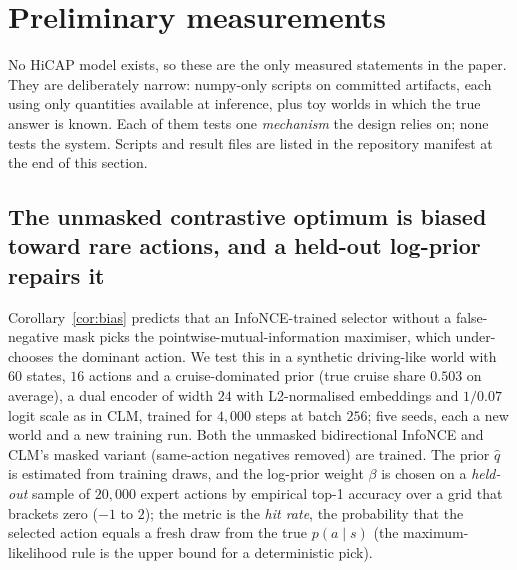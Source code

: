 \section{Preliminary measurements}\label{sec:prelim}
No HiCAP model exists, so these are the only measured statements in the paper. They are deliberately narrow: numpy-only scripts on committed artifacts, each using only quantities available at inference,
plus toy worlds in which the true answer is known. Each of them tests one \emph{mechanism} the design relies on; none tests the system. Scripts and result files are listed in the repository manifest at the end of this section.

\subsection{The unmasked contrastive optimum is biased toward rare actions, and a held-out log-prior repairs it}
\label{sec:prelim-pmi}
Corollary~\ref{cor:bias} predicts that an InfoNCE-trained selector without a false-negative mask picks the pointwise-mutual-information maximiser, which under-chooses the dominant action. We test this in a synthetic driving-like world with $60$ states, $16$ actions and a cruise-dominated prior
(true cruise share $0.503$ on average), a dual encoder of width $24$ with L2-normalised embeddings and $1/0.07$ logit scale as in CLM, trained for $4{,}000$ steps at batch $256$; five seeds, each a new world and a new training run. Both the unmasked bidirectional InfoNCE and CLM's masked variant (same-action negatives removed) are trained.
The prior $\hat q$ is estimated from training draws, and the log-prior weight $\beta$ is chosen on a \emph{held-out} sample of $20{,}000$ expert actions by empirical top-1 accuracy over a grid that brackets zero ($-1$ to $2$); the metric is the \emph{hit rate}, the probability that the selected action equals a fresh draw from the true $p(a\mid s)$ (the maximum-likelihood rule is the upper bound for a deterministic pick).
